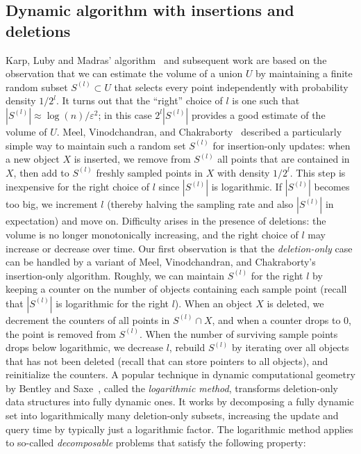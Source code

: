 \documentclass[11pt]{article}
\newcommand{\eps}{\varepsilon}
\begin{document}
\subsection{Dynamic algorithm with insertions and deletions}
Karp, Luby and Madras' algorithm~\cite{KarpLM89} and subsequent work are based on the observation that we can estimate the volume of a union $U$ by maintaining a finite random subset $S^{(l)} \subset U$ that selects every point independently with probability density $1/2^l$. It turns out that the ``right'' choice of $l$ is one such that $|S^{(l)}| \approx \log(n)/\eps^2$; in this case $2^l|S^{(l)}|$ provides a good estimate of the volume of $U$.
%
Meel, Vinodchandran, and Chakraborty~\cite{MVC21} described a particularly simple way to maintain such a random set $S^{(l)}$ for insertion-only updates: when a new object $X$ is inserted, we remove from $S^{(l)}$ all points that are contained in $X$, then add to $S^{(l)}$ freshly sampled points in $X$ with density $1/2^l$. This step is inexpensive for the right choice of $l$ since $|S^{(l)}|$ is logarithmic. If $|S^{(l)}|$ becomes too big, we increment $l$ (thereby halving the sampling rate and also $|S^{(l)}|$ in expectation) and move on.
%
Difficulty arises in the presence of deletions: the volume is no longer monotonically increasing, and the right choice of $l$ may increase or decrease over time. Our first observation is that the \emph{deletion-only} case can be handled by a variant of Meel, Vinodchandran, and Chakraborty's insertion-only algorithm. Roughly, we can maintain $S^{(l)}$ for the right $l$ by keeping a counter on the number of objects containing each sample point (recall that $|S^{(l)}|$ is logarithmic for the right $l$). When an object $X$ is deleted, we decrement the counters of all points in $S^{(l)} \cap X$, and when a counter drops to 0, the point is removed from $S^{(l)}$. When the number of surviving sample points drops below logarithmic, we decrease $l$, rebuild $S^{(l)}$ by iterating over all objects that has not been deleted (recall that can store pointers to all objects), and reinitialize the counters.
%
A popular technique in dynamic computational geometry by Bentley and Saxe~\cite{BS80}, called the \emph{logarithmic method}, transforms deletion-only data structures into fully dynamic ones. It works by decomposing a fully dynamic set into logarithmically many deletion-only subsets, increasing the update and query time by typically just a logarithmic factor. The logarithmic method applies to so-called \emph{decomposable} problems that satisfy the following property:
\end{document}
